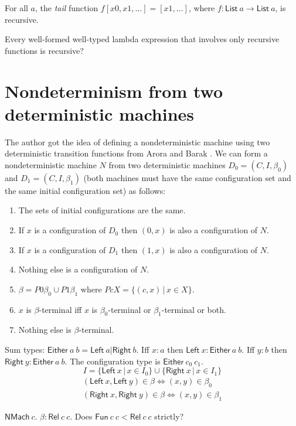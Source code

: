 \documentclass[10pt,statementpaper]{memoir}
\theoremstyle{definition}
\newcommand\Either[2]{\mathsf{Either}~#1~#2}
\newcommand\Left[1]{\mathsf{Left}~#1}
\newcommand\Right[1]{\mathsf{Right}~#1}
\newcommand\NMach[1]{\mathsf{NMach}~#1}
\newcommand\List[1]{\mathsf{List}~#1}
\newcommand\sfFun{\mathsf{Fun}}
\newcommand\sfRel{\mathsf{Rel}}
\newcommand\Relab[2]{\sfRel~#1~#2}
\newcommand\Fun[2]{\sfFun~#1~#2}
\begin{document}
For all $a$, the \emph{tail} function $f [x 0, x 1, \ldots] = [x 1, \ldots]$,
where $f : \List{a} \to \List{a}$, is recursive.

Every well-formed well-typed lambda expression
that involves only recursive functions is recursive?

\section{Nondeterminism from two deterministic machines}

The author got the idea of defining a nondeterministic machine
using two deterministic transition functions
from Arora and Barak \cite[p.~40]{Arora2009}.
We can form a nondeterministic machine $N$
from two deterministic machines $D_0 = (C,I,\beta_0)$ and $D_1 = (C,I,\beta_1)$
(both machines must have the same configuration set and the same initial configuration set)
as follows:
\begin{enumerate}
    \item The sets of initial configurations are the same.
    \item If $x$ is a configuration of $D_0$ then $(0,x)$ is also a configuration of $N$.
    \item If $x$ is a configuration of $D_1$ then $(1,x)$ is also a configuration of $N$.
    \item Nothing else is a configuration of $N$.
    \item $\beta = P 0 \beta_0 \cup P 1 \beta_1$ where $P c X = \{ (c,x) \,|\, x \in X \}$.
    \item $x$ is $\beta$-terminal iff $x$ is $\beta_0$-terminal or $\beta_1$-terminal or both.
    \item Nothing else is $\beta$-terminal.
\end{enumerate}

Sum types: $\Either{a}{b} = \Left a | \Right b$.
Iff $x : a$ then $\Left x : \Either{a}{b}$.
Iff $y : b$ then $\Right y : \Either{a}{b}$.
The configuration type is $\Either{c_0}{c_1}$.
\[
    I =
    \{ \Left x \,|\, x \in I_0 \}
    \cup
    \{ \Right x \,|\, x \in I_1 \}
\]
\begin{align*}
    (\Left x, \Left y) \in \beta \iff (x,y) \in \beta_0
    \\
    (\Right x, \Right y) \in \beta \iff (x,y) \in \beta_1
\end{align*}

$\NMach c$.
$\beta : \Relab{c}{c}$.
Does $\Fun{c}{c} < \Relab{c}{c}$ strictly?
\end{document}

